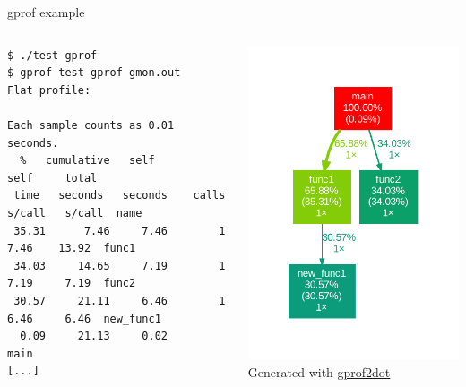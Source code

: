 \begin{frame}[fragile]{gprof example}
  \begin{columns}
    \begin{block}{}
      {\tiny
\begin{verbatim}
$ ./test-gprof
$ gprof test-gprof gmon.out
Flat profile:

Each sample counts as 0.01 seconds.
  %   cumulative   self              self     total
 time   seconds   seconds    calls   s/call   s/call  name
 35.31      7.46     7.46        1     7.46    13.92  func1
 34.03     14.65     7.19        1     7.19     7.19  func2
 30.57     21.11     6.46        1     6.46     6.46  new_func1
  0.09     21.13     0.02                             main
[...]
\end{verbatim}
      }
    \end{block}
    \begin{center}
      \includegraphics[height=0.6\textheight]{slides/linux-app-tracing/gprof2dot.pdf}\\
      {\small Generated with \href{https://github.com/jrfonseca/gprof2dot}{gprof2dot}}
    \end{center}
  \end{columns}
\end{frame}

